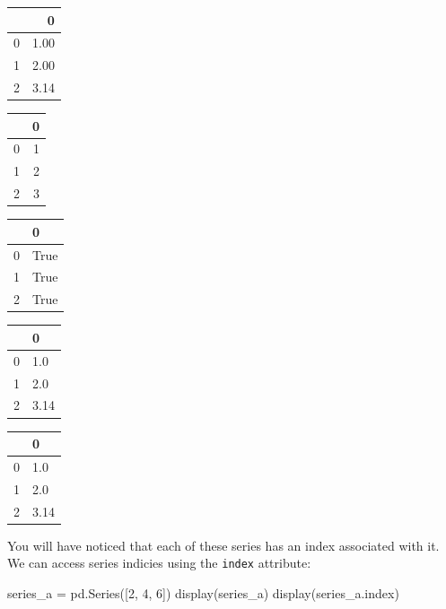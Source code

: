 \documentclass[
  letterpaper,
  DIV=11,
  numbers=noendperiod]{scrreprt}
\newenvironment{Shaded}{\begin{snugshade}}{\end{snugshade}}
\newcommand{\DecValTok}[1]{\textcolor[rgb]{0.68,0.00,0.00}{#1}}
\newcommand{\NormalTok}[1]{\textcolor[rgb]{0.00,0.23,0.31}{#1}}
\newcommand{\OperatorTok}[1]{\textcolor[rgb]{0.37,0.37,0.37}{#1}}
\begin{document}
\begin{tabular}{lr}
\toprule
{} &     0 \\
\midrule
0 &  1.00 \\
1 &  2.00 \\
2 &  3.14 \\
\bottomrule
\end{tabular}

\begin{tabular}{lr}
\toprule
{} &  0 \\
\midrule
0 &  1 \\
1 &  2 \\
2 &  3 \\
\bottomrule
\end{tabular}

\begin{tabular}{ll}
\toprule
{} &     0 \\
\midrule
0 &  True \\
1 &  True \\
2 &  True \\
\bottomrule
\end{tabular}

\begin{tabular}{ll}
\toprule
{} &     0 \\
\midrule
0 &   1.0 \\
1 &   2.0 \\
2 &  3.14 \\
\bottomrule
\end{tabular}

\begin{tabular}{ll}
\toprule
{} &     0 \\
\midrule
0 &   1.0 \\
1 &   2.0 \\
2 &  3.14 \\
\bottomrule
\end{tabular}

You will have noticed that each of these series has an index associated
with it. We can access series indicies using the \texttt{index}
attribute:

\begin{Shaded}
\begin{Highlighting}[]
\NormalTok{series\_a }\OperatorTok{=}\NormalTok{ pd.Series([}\DecValTok{2}\NormalTok{, }\DecValTok{4}\NormalTok{, }\DecValTok{6}\NormalTok{])}
\NormalTok{display(series\_a)}
\NormalTok{display(series\_a.index)}
\end{Highlighting}
\end{Shaded}
\end{document}
